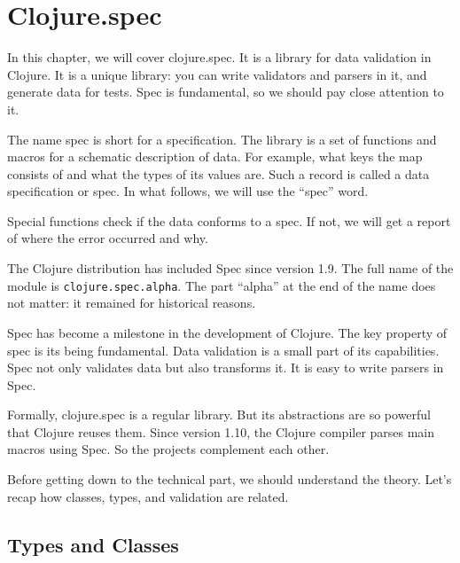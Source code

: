 \chapter{Clojure.spec}

\label{chapter-spec}


\begin{teaser}
In this chapter, we will cover clojure.spec. It is a library for data validation in Clojure. It is a unique library: you can write validators and parsers in it, and generate data for tests. Spec is fundamental, so we should pay close attention to it.
\end{teaser}

The name spec is short for a specification. The library is a set of functions and macros for a schematic description of data. For example, what keys the map consists of and what the types of its values are. Such a record is called a data specification or spec. In what follows, we will use the ``spec'' word.

Special functions check if the data conforms to a spec. If not, we will get a report of where the error occurred and why.


The Clojure distribution has included Spec since version 1.9. The full name of the module is \verb|clojure.spec.alpha|. The part ``alpha'' at the end of the name does not matter: it remained for historical reasons.


Spec has become a milestone in the development of Clojure. The key property of spec is its being fundamental. Data validation is a small part of its capabilities. Spec not only validates data but also transforms it. It is easy to write parsers in Spec.

Formally, clojure.spec is a regular library. But its abstractions are so powerful that Clojure reuses them. Since version 1.10, the Clojure compiler parses main macros using Spec. So the projects complement each other.

Before getting down to the technical part, we should understand the theory. Let's recap how classes, types, and validation are related.

\section{Types and Classes}

